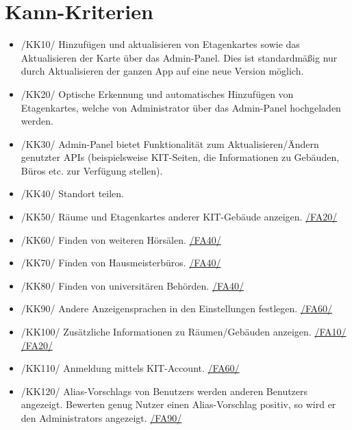 \section{Kann-Kriterien}

\begin{itemize}

    \item{/KK10/} \label{/KK10/} Hinzufügen und aktualisieren von \Glspl{Etagenkarte} sowie das Aktualisieren der \Gls{Karte} über das \Gls{Admin-Panel}.
        Dies ist standardmäßig nur durch Aktualisieren der ganzen App auf eine neue Version möglich.
    \item{/KK20/} \label{/KK20/} Optische Erkennung und automatisches Hinzufügen von \Glspl{Etagenkarte},
          welche von \Gls{Administrator} über das \Gls{Admin-Panel} hochgeladen werden.
          
    \item{/KK30/} \label{/KK30/} \Gls{Admin-Panel} bietet Funktionalität zum Aktualisieren/Ändern genutzter \Gls{API}s (beispielsweise \Gls{KIT}-Seiten, die Informationen zu Gebäuden, Büros etc. zur Verfügung stellen).
    \item{/KK40/} \label{/KK40/} Standort teilen.
    \item{/KK50/} \label{/KK50/} Räume und \Glspl{Etagenkarte} anderer \Gls{KIT}-Gebäude anzeigen. \hyperref[/FA20/]{/FA20/}
    \item{/KK60/} \label{/KK60/} Finden von weiteren Hörsälen. \hyperref[/FA40/]{/FA40/}
    \item{/KK70/} \label{/KK70/} Finden von Hausmeisterbüros. \hyperref[/FA40/]{/FA40/}
    \item{/KK80/} \label{/KK80/} Finden von universitären Behörden. \hyperref[/FA40/]{/FA40/}
    \item{/KK90/} \label{/KK90/} Andere Anzeigensprachen in den Einstellungen festlegen. \hyperref[/FA60/]{/FA60/}
    \item{/KK100/} \label{/KK100/} Zusätzliche Informationen zu Räumen/Gebäuden anzeigen. \hyperref[/FA10/]{/FA10/} \hyperref[/FA20/]{/FA20/}
    \item{/KK110/} \label{/KK110/} Anmeldung mittels \Gls{KIT}-Account. \hyperref[/FA60/]{/FA60/}
    \item{/KK120/} \label{/KK120/} \Glspl{Alias-Vorschlag} von \Glspl{Benutzer} werden anderen \Glspl{Benutzer} angezeigt. Bewerten genug Nutzer einen 
    \Gls{Alias-Vorschlag} positiv, so wird er den \Glspl{Administrator} angezeigt. \hyperref[/FA90/]{/FA90/}
    
        

\end{itemize}
